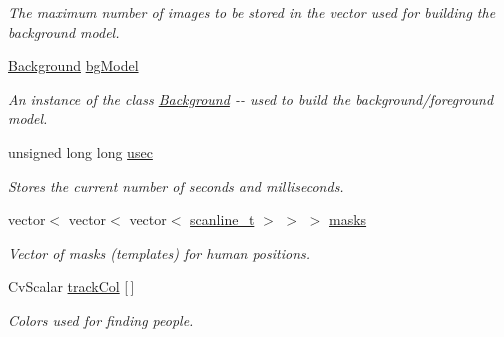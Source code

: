 \begin{DoxyCompactItemize}
\begin{DoxyCompactList}\small\item\em The maximum number of images to be stored in the vector used for building the background model. \item\end{DoxyCompactList}\item 
\hypertarget{classfindperson_a5d2a001b4866dcbf48866109c6541707}{
\hyperlink{classBackground}{Background} \hyperlink{classfindperson_a5d2a001b4866dcbf48866109c6541707}{bgModel}}
\label{classfindperson_a5d2a001b4866dcbf48866109c6541707}

\begin{DoxyCompactList}\small\item\em An instance of the class {\ttfamily \hyperlink{classBackground}{Background}} -\/-\/ used to build the background/foreground model. \item\end{DoxyCompactList}\item 
\hypertarget{classfindperson_ab8a3060a5d457e6907f73cbbc25ccae0}{
unsigned long long \hyperlink{classfindperson_ab8a3060a5d457e6907f73cbbc25ccae0}{usec}}
\label{classfindperson_ab8a3060a5d457e6907f73cbbc25ccae0}

\begin{DoxyCompactList}\small\item\em Stores the current number of seconds and milliseconds. \item\end{DoxyCompactList}\item 
\hypertarget{classfindperson_adad90fa030af56592ad194a41341ffcd}{
vector$<$ vector$<$ vector$<$ \hyperlink{structscanline__t}{scanline\_\-t} $>$ $>$ $>$ \hyperlink{classfindperson_adad90fa030af56592ad194a41341ffcd}{masks}}
\label{classfindperson_adad90fa030af56592ad194a41341ffcd}

\begin{DoxyCompactList}\small\item\em Vector of masks (templates) for human positions. \item\end{DoxyCompactList}\item 
\hypertarget{classfindperson_ac1b0baa7d4a9b358f4ea4f2b643f174b}{
CvScalar \hyperlink{classfindperson_ac1b0baa7d4a9b358f4ea4f2b643f174b}{trackCol} \mbox{[}$\,$\mbox{]}}
\label{classfindperson_ac1b0baa7d4a9b358f4ea4f2b643f174b}

\begin{DoxyCompactList}\small\item\em Colors used for finding people. \item\end{DoxyCompactList}\end{DoxyCompactItemize}


